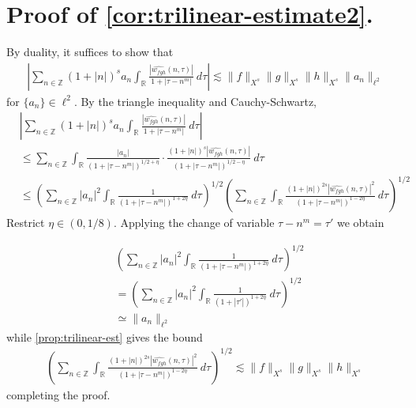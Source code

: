 \documentclass[12pt,reqno]{amsart}
\numberwithin{equation}{section}  %
\numberwithin{figure}{section}
\newcommand{\rr}{\mathbb{R}}
\newcommand{\zz}{\mathbb{Z}}
\newcommand{\wh}{\widehat}
\theoremstyle{plain}
\theoremstyle{definition}
\theoremstyle{remark}
\begin{document}
\section{Proof of \autoref{cor:trilinear-estimate2}.}
By duality, it suffices to show that 
%
\begin{equation*}
	\begin{split}
		| \sum_{n \in \zz} \left (1 + |n| \right )^{s}
		a_n \int_{\rr} \frac{|\wh{w_{fgh}}(n, \tau)|}{1 
		+ | \tau - n^{m } |} \ d \tau | \lesssim \|f\|_{X^s} \|g\|_{X^s} \|h\|_{X^s}
		\|a_n \|_{\ell^2}
	\end{split}
\end{equation*}
%
for $\{a_n\} \in \ell^2$. By the triangle inequality 
and Cauchy-Schwartz,
%
\begin{equation}
	\label{1m}
	\begin{split}
		& | \sum_{n \in \zz} \left (1 + |n| \right )^{s} a_n
		\int_{\rr}\frac{| \wh{w_{fgh}}(n, \tau) |}{1 + | \tau - n^{m } |} \ d \tau |
		\\
		& \le \sum_{n \in \zz} \int_{\rr} \frac{| a_n |}{\left( 1 + 
		| \tau - n^{m } |
		\right)^{1/2 + \eta}} \cdot \frac{\left( 1 + | n| \right)^s  |
		\wh{w_{fgh}}(n, \tau) |}{\left( 
		1 + | \tau - n^{m } | \right)^{1/2 - \eta}} \ d \tau
		\\
		& \le \left( \sum_{n \in \zz} | a_{n} |^2\int_{\rr} \frac{1}{\left( 1 + | \tau - n^{m } | \right)^{1 + 2 \eta}} \ d \tau  
		\right)^{1/2} 
		\left ( \sum_{n \in \zz}\int_{\rr} \frac{\left (1 + |n| \right )^{2s} | \wh{w_{fgh}}(n, \tau) 
		|^2}{\left( 1 + | \tau - n^{m } | \right)^{1 - 2 \eta}}\ d \tau 
		\right)^{1/2}
	\end{split}
\end{equation}
%
Restrict $\eta \in (0, 1/8)$. Applying the change of variable $\tau - n^{m }
= \tau'$ we obtain  %

\begin{equation*}
	\begin{split}
		& \left( \sum_{n \in \zz} | a_{n} |^2\int_{\rr} \frac{1}{\left( 1 + | \tau -
		n^{m } | \right)^{1 + 2 \eta}} \ d \tau  
		\right)^{1/2} 
		\\
		& = \left ( \sum_{n \in \zz}
		| a_n |^2 
		\int_{\rr} \frac{1}{\left( 1 + | \tau' | \right)^{1 + 2 \eta}} \ d 
		\tau \right)^{1/2}
		\\
		& \simeq \|a_n\|_{\ell^2}
		\end{split}
\end{equation*}
while \autoref{prop:trilinear-est} gives the bound
\begin{equation*}
	\begin{split}
		\left ( \sum_{n \in \zz}\int_{\rr} \frac{\left (1 + |n| \right )^{2s} | \wh{w_{fgh}}(n, \tau) 
		|^2}{\left( 1 + | \tau - n^{m } | \right)^{1 - 2 \eta}}\ d \tau 
		\right)^{1/2} \lesssim \|f\|_{X^s} \|g\|_{X^s} \|h\|_{X^s}
	\end{split}
\end{equation*}
%
completing the proof.
\qquad \qedsymbol
%
%
%
\end{document}
